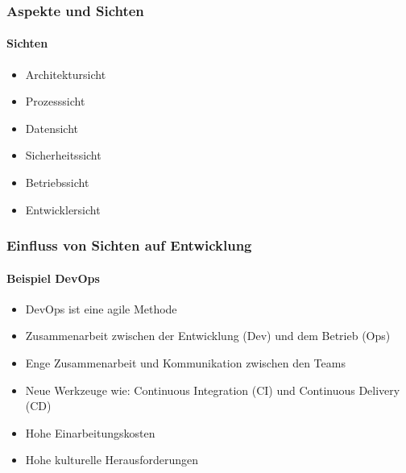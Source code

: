 \begin{frame}
  \frametitle{Aspekte und Sichten}
  \framesubtitle{Sichten}
  \begin{itemize}
    \item Architektursicht
    \item Prozesssicht
    \item Datensicht
    \item Sicherheitssicht
    \item Betriebssicht
    \item Entwicklersicht
  \end{itemize}
\end{frame}

\begin{frame}
  \frametitle{Einfluss von Sichten auf Entwicklung}
  \framesubtitle{Beispiel DevOps}
  \begin{itemize}
    \item DevOps ist eine agile Methode
    \item Zusammenarbeit zwischen der Entwicklung (Dev) und dem Betrieb (Ops)
    \item Enge Zusammenarbeit und Kommunikation zwischen den Teams
    \item Neue Werkzeuge wie: Continuous Integration (CI) und Continuous Delivery (CD)
    \item Hohe Einarbeitungskosten
    \item Hohe kulturelle Herausforderungen
  \end{itemize}
\end{frame}
